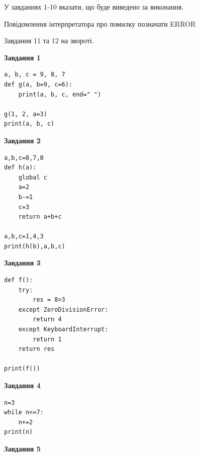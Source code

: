 \documentclass[12pt, ukrainian]{article}
\begin{document}
{{{{{У завданнях 1-10 вказати, що буде виведено за виконання.

Повідомлення інтерпретатора про помилку позначати ERROR

Завдання 11 та 12 на звороті.

\begin{minipage}[t]{7.5cm}

\begin{center}
\textbf{Завдання 1}
\end{center}

\begin{verbatim}
a, b, c = 9, 8, 7
def g(a, b=9, c=6):
    print(a, b, c, end=" ")

g(1, 2, a=3)
print(a, b, c)
\end{verbatim}



\begin{center}
\textbf{Завдання 2}
\end{center}

\begin{verbatim}
a,b,c=8,7,0
def h(a):
    global c
    a=2
    b-=1
    c=3
    return a+b+c

a,b,c=1,4,3
print(h(b),a,b,c)
\end{verbatim}



\begin{center}
\textbf{Завдання 3}
\end{center}

\begin{verbatim}
def f():
    try:
        res = 8>3
    except ZeroDivisionError: 
        return 4
    except KeyboardInterrupt: 
        return 1
    return res

print(f())
\end{verbatim}



\begin{center}
\textbf{Завдання 4}
\end{center}

\begin{verbatim}
n=3
while n<=7:
    n+=2
print(n)
\end{verbatim}

\end{minipage}
\vline \hspace{6mm}
\begin{minipage}[t]{10.5cm}

\begin{center}
\textbf{Завдання 5}
\end{center}


\end{minipage}}}}}}
\end{document}
